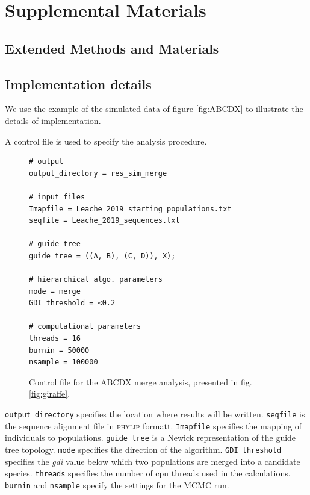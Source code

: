 \documentclass[A4]{article1}
\begin{document}

\renewcommand{\bibfont}{\scriptsize}



\newpage
\FloatBarrier %
\setcounter{table}{0} %
\setcounter{figure}{0} %
\renewcommand{\thetable}{S\arabic{table}} %
\renewcommand{\thefigure}{S\arabic{figure}} %

\section{Supplemental Materials}

\subsection{Extended Methods and Materials}

\subsection{Implementation details}

We use the example of the simulated data of figure \ref{fig:ABCDX} to
illustrate the details of implementation.

A control file is used to specify the analysis procedure.

\begin{figure}[h]
	\footnotesize
    \begin{verbatim}
# output
output_directory = res_sim_merge

# input files
Imapfile = Leache_2019_starting_populations.txt
seqfile = Leache_2019_sequences.txt

# guide tree
guide_tree = ((A, B), (C, D)), X);

# hierarchical algo. parameters
mode = merge
GDI threshold = <0.2

# computational parameters
threads = 16
burnin = 50000
nsample = 100000
    \end{verbatim}

	\caption{Control file for the ABCDX merge analysis, presented in fig. \ref{fig:giraffe}. %
} \label{fig:ABCDX_mcf}
\end{figure}

\texttt{output directory} specifies the location where results will be written.
\texttt{seqfile} is the sequence alignment file in \textsc{phylip} formatt. 
\texttt{Imapfile} specifies the mapping of individuals to populations.  
\texttt{guide tree} is a Newick representation of the guide tree topology.  
\texttt{mode} specifies the direction of the algorithm.
\texttt{GDI threshold} specifies the \textit{gdi} value below which two populations are merged into a candidate species. 
\texttt{threads} specifies the number of cpu threads used in the calculations. 
\texttt{burnin} and \texttt{nsample} specify the settings for the MCMC run.
\end{document}
